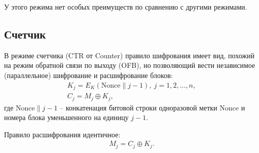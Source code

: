 У этого режима нет особых преимуществ по сравнению с другими режимами.


\subsection{Счетчик}

В режиме счетчика (CTR от Counter) правило шифрования имеет вид, похожий на режим обратной связи по выходу (OFB), но позволяющий вести независимое (параллельное) шифрование и расшифрование блоков:
\[ \begin{array}{l}
    K_j = E_K(\textrm{Nonce} \| j - 1), ~ j = 1, 2, \dots, n, \\
    C_j = M_j \oplus K_j,
\end{array} \]
где $\textrm{Nonce} \| j - 1$ -- конкатенация битовой строки одноразовой метки $\textrm{Nonce}$ и номера блока уменьшенного на единицу $j-1$.

Правило расшифрования идентичное:
\[ \begin{array}{l}
    M_j = C_j \oplus K_j. \\
\end{array} \]
